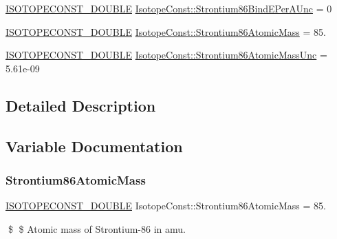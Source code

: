 \begin{DoxyCompactItemize}
\mbox{\hyperlink{group___isotope_const-_macros_ga8f45a7272ce02c0b4c65c44636ed719a}{I\+S\+O\+T\+O\+P\+E\+C\+O\+N\+S\+T\+\_\+\+D\+O\+U\+B\+LE}} \mbox{\hyperlink{group___isotope_const-_strontium-_sr86_gac2d2960e9e6ebd839bae24fb350d0028}{Isotope\+Const\+::\+Strontium86\+Bind\+E\+Per\+A\+Unc}} = 0
\item 
\mbox{\hyperlink{group___isotope_const-_macros_ga8f45a7272ce02c0b4c65c44636ed719a}{I\+S\+O\+T\+O\+P\+E\+C\+O\+N\+S\+T\+\_\+\+D\+O\+U\+B\+LE}} \mbox{\hyperlink{group___isotope_const-_strontium-_sr86_gab4cf596a164fc4d66c48f4b1523bc3b0}{Isotope\+Const\+::\+Strontium86\+Atomic\+Mass}} = 85.
\item 
\mbox{\hyperlink{group___isotope_const-_macros_ga8f45a7272ce02c0b4c65c44636ed719a}{I\+S\+O\+T\+O\+P\+E\+C\+O\+N\+S\+T\+\_\+\+D\+O\+U\+B\+LE}} \mbox{\hyperlink{group___isotope_const-_strontium-_sr86_gae2a1a39ef33c98c10d94975d64303f70}{Isotope\+Const\+::\+Strontium86\+Atomic\+Mass\+Unc}} = 5.\+61e-\/09
\end{DoxyCompactItemize}


\subsection{Detailed Description}


\subsection{Variable Documentation}
\mbox{\label{group___isotope_const-_strontium-_sr86_gab4cf596a164fc4d66c48f4b1523bc3b0}} 
\subsubsection{\texorpdfstring{Strontium86\+Atomic\+Mass}{Strontium86AtomicMass}}
{\footnotesize\ttfamily \mbox{\hyperlink{group___isotope_const-_macros_ga8f45a7272ce02c0b4c65c44636ed719a}{I\+S\+O\+T\+O\+P\+E\+C\+O\+N\+S\+T\+\_\+\+D\+O\+U\+B\+LE}} Isotope\+Const\+::\+Strontium86\+Atomic\+Mass = 85.}

\$ \$ Atomic mass of Strontium-\/86 in amu. \mbox{\label{group___isotope_const-_strontium-_sr86_gae2a1a39ef33c98c10d94975d64303f70}} 
